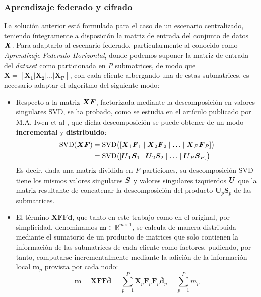 \documentclass[00-Trabajo_Final.tex]{subfiles}
\begin{document}
\subsubsection{Aprendizaje federado y cifrado}

La solución anterior está formulada para el caso de un escenario centralizado, teniendo íntegramente a disposición la matriz de entrada del conjunto de datos $\boldsymbol{X}$. Para adaptarlo al escenario federado, particularmente al conocido como \textit{Aprendizaje Federado Horizontal}, donde podemos suponer la matriz de entrada del \textit{dataset} como particionada en \textit{P} submatrices, de modo que $\boldsymbol{X} = [\boldsymbol{X_1|X_2|\ldots|X_P}]$, con cada cliente albergando una de estas submatrices, es necesario adaptar el algoritmo del siguiente modo:

\begin{itemize}[itemsep=2pt]
    \item Respecto a la matriz $\boldsymbol{XF}$, factorizada mediante la descomposición en valores singulares SVD, se ha probado, como se estudia en el artículo publicado por M.A. Iwen et al \cite{svd_inc}, que dicha descomposición se puede obtener de un modo \textbf{incremental} y \textbf{distribuido}: 
    \begin{align}\label{eqn:svd_incremental}
        \text{SVD}(\boldsymbol{XF})  
        &= \text{SVD}\bigl([\boldsymbol{X}_1\boldsymbol{F}_1 \mid \boldsymbol{X}_2\boldsymbol{F}_2 \mid \ldots \mid \boldsymbol{X}_P\boldsymbol{F}_P]\bigr) \nonumber \\
        &= \text{SVD}\bigl([\boldsymbol{U}_1\boldsymbol{S}_1 \mid \boldsymbol{U}_2\boldsymbol{S}_2 \mid \ldots \mid \boldsymbol{U}_P\boldsymbol{S}_P]\bigr)
    \end{align}
    Es decir, dada una matriz dividida en \textit{P} particiones, su descomposición SVD tiene los mismos valores singulares $\boldsymbol{S}$ y valores singulares izquierdos $\boldsymbol{U}$ que la matriz resultante de concatenar la descomposición del producto $\boldsymbol{U}_p \boldsymbol{S}_p$ de las submatrices.

    \item El término $\boldsymbol{XFF\bar{d}}$, que tanto en este trabajo como en el original, por simplicidad, denominamos $\boldsymbol{m} \in \mathbb{R}^{m\times1}$, se calcula de manera distribuida mediante el sumatorio de un producto de matrices que solo contienen la información de las submatrices de cada cliente como factores, pudiendo, por tanto, computarse incrementalmente mediante la adición de la información local $\boldsymbol{m}_p$ provista por cada nodo:
    \begin{equation}\label{eqn:m_incremental}
        \boldsymbol{m} = \boldsymbol{XFF\bar{d}} = 
        \sum_{p=1}^{P}\boldsymbol{X}_p\boldsymbol{F}_p\boldsymbol{F}_p \boldsymbol{\bar{d}}_p = \sum_{p=1}^{P} m_p
    \end{equation}
\end{itemize}
\end{document}
